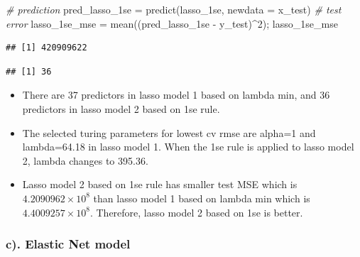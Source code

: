 \documentclass[
]{article}
\newenvironment{Shaded}{\begin{snugshade}}{\end{snugshade}}
\newcommand{\AttributeTok}[1]{\textcolor[rgb]{0.77,0.63,0.00}{#1}}
\newcommand{\CommentTok}[1]{\textcolor[rgb]{0.56,0.35,0.01}{\textit{#1}}}
\newcommand{\DecValTok}[1]{\textcolor[rgb]{0.00,0.00,0.81}{#1}}
\newcommand{\FunctionTok}[1]{\textcolor[rgb]{0.00,0.00,0.00}{#1}}
\newcommand{\NormalTok}[1]{#1}
\newcommand{\OtherTok}[1]{\textcolor[rgb]{0.56,0.35,0.01}{#1}}
\newcommand{\SpecialCharTok}[1]{\textcolor[rgb]{0.00,0.00,0.00}{#1}}
\begin{document}
\begin{Shaded}
\begin{Highlighting}[]
\CommentTok{\# prediction}
\NormalTok{pred\_lasso\_1se }\OtherTok{=} \FunctionTok{predict}\NormalTok{(lasso\_1se, }\AttributeTok{newdata =}\NormalTok{ x\_test)}
\CommentTok{\# test error}
\NormalTok{lasso\_1se\_mse }\OtherTok{=} \FunctionTok{mean}\NormalTok{((pred\_lasso\_1se }\SpecialCharTok{{-}}\NormalTok{ y\_test)}\SpecialCharTok{\^{}}\DecValTok{2}\NormalTok{); lasso\_1se\_mse}
\end{Highlighting}
\end{Shaded}

\begin{verbatim}
## [1] 420909622
\end{verbatim}

\begin{Shaded}
\end{Shaded}

\begin{verbatim}
## [1] 36
\end{verbatim}

\begin{itemize}
\item
  There are 37 predictors in lasso model 1 based on lambda min, and 36
  predictors in lasso model 2 based on 1se rule.
\item
  The selected turing parameters for lowest cv rmse are alpha=1 and
  lambda=64.18 in lasso model 1. When the 1se rule is applied to lasso
  model 2, lambda changes to 395.36.
\item
  Lasso model 2 based on 1se rule has smaller test MSE which is
  \ensuremath{4.2090962\times 10^{8}} than lasso model 1 based on lambda
  min which is \ensuremath{4.4009257\times 10^{8}}. Therefore, lasso
  model 2 based on 1se is better.
\end{itemize}

\hypertarget{c.-elastic-net-model}{%
\subsubsection{c). Elastic Net model}\label{c.-elastic-net-model}}
\end{document}
